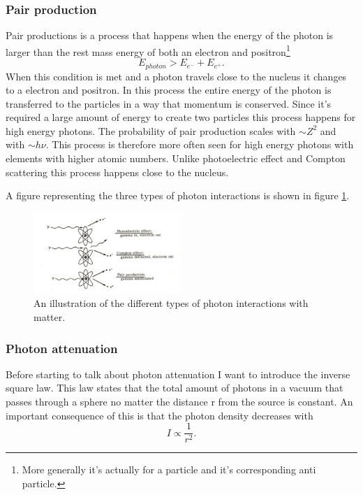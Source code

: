 \documentclass[jmp, amsmath, amssymb, reprint]{article}
\numberwithin{equation}{section}
\begin{document}
\begin{multicols}{2}
\subsubsection{Pair production}

Pair productions is a process that happens when the energy of the photon is larger than the rest mass energy of both an electron and positron\footnote{More generally it's actually for a particle and it's corresponding anti particle.}
\begin{equation}
E_{photon} > E_{e^-} + E_{e^+}.
\end{equation}
When this condition is met and a photon travels close to the nucleus it changes to a electron and positron. In this process the entire energy of the photon is transferred to the particles in a way that momentum is conserved. Since it's required a large amount of energy to create two particles this process happens for high energy photons. The probability of pair production scales with \(\sim Z^2\) and with \(\sim h\nu\). This process is therefore more often seen for high energy photons with elements with higher atomic numbers. Unlike photoelectric effect and Compton scattering this process happens close to the nucleus.

A figure representing the three types of photon interactions is shown in figure \ref{fig:photon_interactions}.

\begin{figure}[H]
	\centering
  	\includegraphics[width=0.50\textwidth]{photon_interactions.png}
	\caption{An illustration of the different types of photon interactions with matter.}
	\label{fig:photon_interactions}
\end{figure}

\subsubsection{Photon attenuation}

Before starting to talk about photon attenuation I want to introduce the inverse square law. This law states that the total amount of photons in a vacuum that passes through a sphere no matter the distance r from the source is constant. An important consequence of this is that the photon density decreases with
\begin{equation}
I\propto \frac{1}{r^2}.
\end{equation}


\end{multicols}
\end{document}
